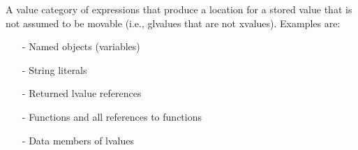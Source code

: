 


A value category of expressions that produce a location for a stored value that is not assumed to be movable (i.e., glvalues that are not xvalues). Examples are:

\begin{itemize}
\item [-]
Named objects (variables)

\item [-]
String literals

\item [-]
Returned lvalue references

\item [-]
Functions and all references to functions

\item [-]
Data members of lvalues
\end{itemize}
